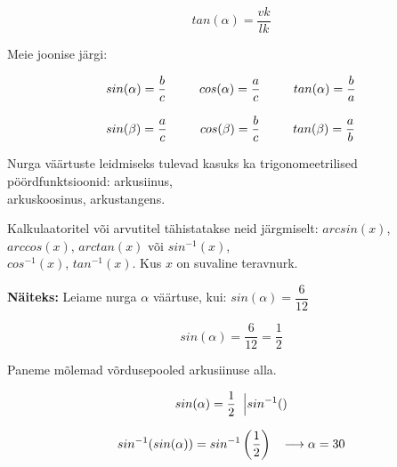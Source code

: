 \begin{center}
{{{\begin{flushleft}
\begin{equation}
\label{41_eq3}
\boxed{tan(\alpha)=\dfrac{vk}{lk}}
\end{equation}

\vspace{2mm}
\hspace{5mm}
Meie joonise järgi:

\begin{equation}
\label{41_eq4}
\begin{tabular}{l}
$sin(\alpha)=\dfrac{b}{c}$ \hspace{7mm} $cos(\alpha)=\dfrac{a}{c}$ \hspace{7mm} $tan(\alpha)=\dfrac{b}{a}$\\
\\
$sin(\beta)=\dfrac{a}{c}$ \hspace{7mm} $cos(\beta)=\dfrac{b}{c}$ \hspace{7mm} $tan(\beta)=\dfrac{a}{b}$
\end{tabular}
\end{equation} 

\vspace{2mm}
\hspace{5mm}
Nurga väärtuste leidmiseks tulevad kasuks ka trigonomeetrilised pöördfunktsioonid: arkusiinus,\\ \hspace{5mm} arkuskoosinus, arkustangens.

\vspace{2mm}
\hspace{5mm}
Kalkulaatoritel või arvutitel tähistatakse neid järgmiselt: $arcsin(x)$, $arccos(x)$, $arctan(x)$ või $sin^{-1}(x)$,\\ \hspace{5mm} $cos^{-1}(x)$, $tan^{-1}(x)$. Kus $x$ on suvaline teravnurk.

\vspace{2mm}
\hspace{5mm}
\textbf{Näiteks:} Leiame nurga $\alpha$ väärtuse, kui: $sin(\alpha)=\dfrac{6}{12}$

\hspace{5mm}

\[ sin(\alpha)=\dfrac{6}{12}=\dfrac{1}{2} \] 

\hspace{5mm}
Paneme mõlemad võrdusepooled arkusiinuse alla.

\[ sin(\alpha)=\dfrac{1}{2} \hspace{2mm} \Big| sin^{-1}() \]

\[ sin^{-1}(sin(\alpha))= sin^{-1} \left( \dfrac{1}{2} \right) \hspace{3mm} \longrightarrow \alpha = 30 \]

\end{flushleft}
}}}
\end{center}





